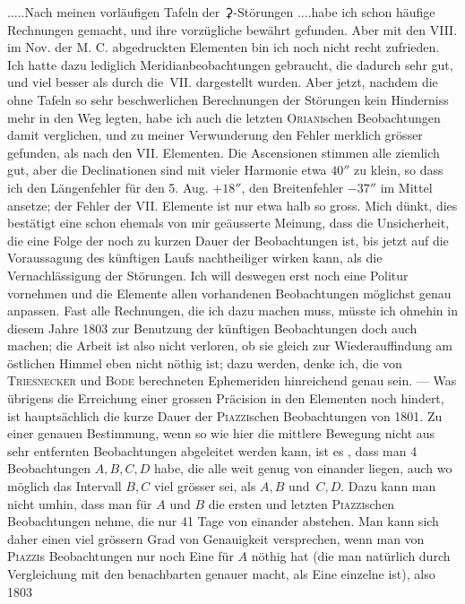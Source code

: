 \noindent\hspace*{\parindent}.\quad.\quad.\quad.\quad.\quad Nach meinen vorläufigen Tafeln der {\AstroSymbols ⚳}-Störungen .\quad.\quad.\quad.\quad habe ich schon häufige Rechnungen gemacht, und ihre vorzügliche  bewährt gefunden. Aber mit den VIII. im Nov. der M. C. abgedruckten Elementen bin ich noch nicht recht zufrieden. Ich hatte dazu lediglich Meridianbeobachtungen gebraucht, die dadurch sehr gut, und viel besser als durch die\, VII. dargestellt wurden. Aber jetzt, nachdem die ohne Tafeln so sehr beschwerlichen Berechnungen der Störungen kein Hinderniss mehr in den Weg legten, habe ich auch die letzten \textsc{Oriani}schen Beobachtungen damit verglichen, und zu meiner Verwunderung den Fehler merklich grösser gefunden, als nach den VII. Elementen. Die Ascensionen stimmen alle ziemlich gut, aber die Declinationen sind mit vieler Harmonie etwa \(40''\) zu klein, so dass ich den Längenfehler für den 5. Aug. \(+18''\), den Breitenfehler \(-37''\) im Mittel ansetze; der Fehler der VII. Elemente ist nur etwa halb so gross. Mich dünkt, dies bestätigt eine schon ehemals von mir geäusserte Meinung, dass die Unsicherheit, die eine Folge der noch zu kurzen Dauer der Beobachtungen ist, bis jetzt auf die Voraussagung des künftigen Laufs nachtheiliger wirken kann, als die Vernachlässigung der Störungen. Ich will deswegen erst noch eine Politur vornehmen und die Elemente allen vorhandenen Beobachtungen möglichst genau anpassen. Fast alle Rechnungen, die ich dazu machen muss, müsste ich ohnehin in diesem Jahre 1803 zur Benutzung der künftigen Beobachtungen doch auch machen; die Arbeit ist also nicht verloren, ob sie gleich zur Wiederauffindung am östlichen Himmel eben nicht nöthig ist; dazu werden, denke ich, die von \textsc{Triesnecker} und \textsc{Bode} berechneten Ephemeriden hinreichend genau sein. — Was übrigens die Erreichung einer grossen Präcision in den Elementen noch hindert, ist hauptsächlich die kurze Dauer der \textsc{Piazzi}schen Beobachtungen von 1801. Zu einer genauen Bestimmung, wenn so wie hier die mittlere Bewegung nicht aus sehr entfernten Beobachtungen abgeleitet werden kann, ist es , dass man 4 Beobachtungen \(A,B,C,D\) habe, die alle weit genug von einander liegen, auch wo möglich das Intervall \(B,C\) viel grösser sei, als \(A,B\) und\, \(C,D\). Dazu kann man nicht umhin, dass man für \(A\) und \(B\) die ersten und letzten \textsc{Piazzi}schen Beobachtungen nehme, die nur 41 Tage von einander abstehen. Man kann sich daher einen viel grössern Grad von Genauigkeit versprechen, wenn man von \textsc{Piazzi}s Beobachtungen nur noch Eine für \(A\) nöthig hat (die man natürlich durch Vergleichung mit den benachbarten genauer macht, als Eine einzelne ist), also 1803
